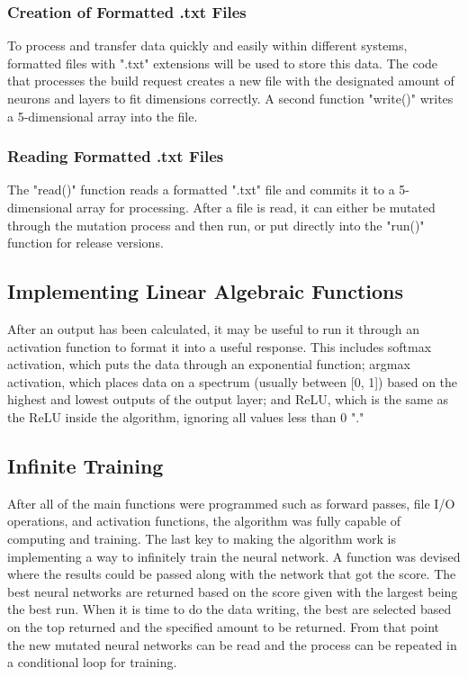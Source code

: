 \subsubsection*{Creation of Formatted .txt Files}

To process and transfer data quickly and easily within different systems, formatted files with ".txt" extensions will be used to store this data. The code that processes the build request creates a new file with the designated amount of neurons and layers to fit dimensions correctly. A second function "write()" writes a 5-dimensional array into the file.

\subsubsection*{Reading Formatted .txt Files}

The "read()" function reads a formatted ".txt" file and commits it to a 5-dimensional array for processing. After a file is read, it can either be mutated through the mutation process and then run, or put directly into the "run()" function for release versions.

\subsection*{Implementing Linear Algebraic Functions}

After an output has been calculated, it may be useful to run it through an activation function to format it into a useful response. This includes softmax activation, which puts the data through an exponential function; argmax activation, which places data on a spectrum (usually between [0, 1]) based on the highest and lowest outputs of the output layer; and ReLU, which is the same as the ReLU inside the algorithm, ignoring all values less than 0 "\cite{activation_functions_website}."

\subsection*{Infinite Training}

After all of the main functions were programmed such as forward passes, file I/O operations, and activation functions, the algorithm was fully capable of computing and training. The last key to making the algorithm work is implementing a way to infinitely train the neural network. A function was devised where the results could be passed along with the network that got the score. The best neural networks are returned based on the score given with the largest being the best run. When it is time to do the data writing, the best are selected based on the top returned and the specified amount to be returned. From that point the new mutated neural networks can be read and the process can be repeated in a conditional loop for training. 

